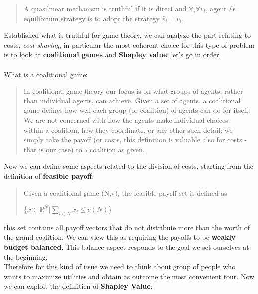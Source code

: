 \documentclass{article}
\begin{document}
{\begin{quote}
    A quasilinear mechanism is truthful if it is direct and $\forall _i \forall v_i$, agent \textit{i}'s equilibrium strategy is to adopt the strategy $\hat{v}_i = v_i$.
\end{quote}
Established what is truthful for game theory, we can analyze the part relating to costs, \textit{cost sharing}, in particular the most coherent choice for this type of problem is to look at  \textbf{coalitional games} and \textbf{Shapley value}; let's go in order.\\\\
What is a coalitional game:
\begin{quote}
    In coalitional game theory our focus is on what groups of agents, rather than individual agents, can achieve. Given a set of agents, a coalitional game defines how well each group (or coalition) of agents can do for itself. We are not concerned with how the agents make individual choices \\within a coalition, how they coordinate, or any other such detail; we simply take the payoff (or costs, this definition is valuable also for costs - that is our case) to a coalition as given.
\end{quote}
Now we can define some aspects related to the division of costs, starting from the definition of \textbf{feasible payoff}:
\begin{quote}
    Given a coalitional game (N,v), the feasible payoff set is defined as 
    \begin{center}
        \{$x \in \mathbb{R}^N \vert \sum_{i\in N} x_i \le v(N)$\}
    \end{center}
\end{quote}
this set contains all payoff vectors that do not distribute more than the worth of the grand coalition. We can view this as requiring the payoffs to be \textbf{weakly budget balanced}. This balance aspect responds to the goal we set ourselves at the beginning.
\\Therefore for this kind of issue we need to think about group of people who wants to maximize utilities and obtain as outcome the most convenient tour. Now we can exploit the definition of \textbf{Shapley Value}:
}
\end{document}
